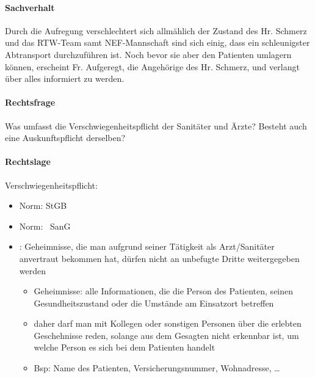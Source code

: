 \paragraph*{Sachverhalt}

Durch die Aufregung verschlechtert sich allmählich der Zustand des Hr.
Schmerz und das RTW-Team samt NEF-Mannschaft sind sich einig, dass ein
schleunigster Abtransport durchzuf\"uhren ist. Noch bevor sie aber den
Patienten umlagern k\"onnen, erscheint Fr. Aufgeregt, die
Angeh\"orige des Hr. Schmerz, und verlangt \"uber alles informiert zu werden.

\paragraph*{Rechtsfrage}

Was umfasst die Verschwiegenheitspflicht der Sanitäter und \"Arzte?
Besteht auch eine Auskunftspflicht derselben?

\paragraph*{Rechtslage}

Verschwiegenheitspflicht:

\begin{itemize}
	\item {\mdseries
	 Norm:  StGB}

	\item {\mdseries
	 Norm: ~SanG}

	\item {\mdseries
	: Geheimnisse, die man aufgrund seiner
	Tätigkeit als Arzt/Sanitäter anvertraut bekommen hat, d\"urfen
	nicht an unbefugte Dritte weitergegeben werden}

	\begin{itemize}
	
		\item {\mdseries
		Geheimnisse: alle Informationen, die die Person des
		Patienten, seinen Gesundheitszustand oder die Umstände am
		Einsatzort betreffen}

		\item {\mdseries
		daher darf man mit Kollegen oder sonstigen Personen \"uber die erlebten
		Geschehnisse reden, solange aus dem Gesagten nicht erkennbar ist, um
		welche Person es sich bei dem Patienten handelt }

		\item {\mdseries
		Bsp: Name des Patienten, Versicherungsnummer, Wohnadresse,
		{\dots}}
		
	\end{itemize}
	
\end{itemize}

